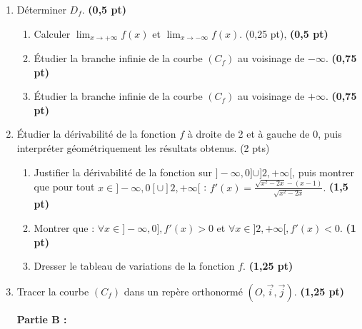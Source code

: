 \documentclass[12pt,a4paper]{article}
\begin{document}
\begin{enumerate}
\item  Déterminer \( D_f \). \hspace{1cm} \textbf{(0,5 pt)}

\begin{enumerate}
    \item Calculer \( \lim_{x \to +\infty} f(x) \) et \( \lim_{x \to -\infty} f(x) \). \hspace{1cm} (0,25 pt), \textbf{(0,5 pt)}
    \item Étudier la branche infinie de la courbe \( (C_f) \) au voisinage de \( -\infty \). \hspace{1cm} \textbf{(0,75 pt)}
    \item Étudier la branche infinie de la courbe \( (C_f) \) au voisinage de \( +\infty \). \hspace{1cm} \textbf{(0,75 pt)}
\end{enumerate}

\item Étudier la dérivabilité de la fonction \( f \) à droite de 2 et à gauche de 0, puis interpréter géométriquement les résultats obtenus. \hspace{1cm} (2 pts)

\begin{enumerate}
    \item Justifier la dérivabilité de la fonction sur \( ]-\infty, 0] \cup ]2, +\infty[ \), puis montrer que pour tout \( x \in ]-\infty, 0[ \cup ]2, +\infty[ \) :
    \(
    f'(x) = \frac{\sqrt{x^2 - 2x} - (x - 1)}{\sqrt{x^2 - 2x}}.
    \)    \hspace{5cm} \textbf{(1,5 pt)}

    
    \item Montrer que : \( \forall x \in ]-\infty, 0], f'(x) > 0 \) et \( \forall x \in ]2, +\infty[, f'(x) < 0 \). \hspace{1cm} \textbf{(1 pt)}
    
    \item Dresser le tableau de variations de la fonction \( f \). \hspace{1cm} \textbf{(1,25 pt)}
\end{enumerate}

\item Tracer la courbe \( (C_f) \) dans un repère orthonormé \( (O, \vec{i}, \vec{j}) \). \hspace{1cm} \textbf{(1,25 pt)}

\textbf{Partie B :}


\end{enumerate}
\end{document}
